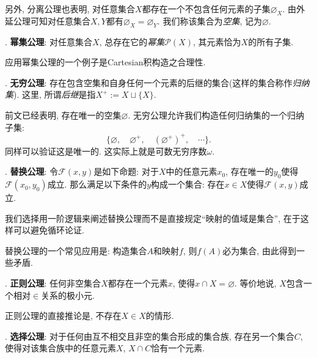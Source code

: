另外, 分离公理也表明, 对任意集合$X$都存在一个不包含任何元素的子集$\varnothing _X$. 由外延公理可知对任意集合$X, Y$都有$\varnothing _X = \varnothing _Y$. 我们称该集合为\textit{空集}, 记为$\varnothing$. 

\vspace{0.5em}
. \textbf{幂集公理}: 对任意集合$X$, 总存在它的\textit{幂集}$\mathcal{P}(X)$, 其元素恰为$X$的所有子集. 

应用幂集公理的一个例子是Cartesian积构造之合理性. 

\vspace{0.5em}
. \textbf{无穷公理}: 存在包含空集和自身任何一个元素的后继的集合(这样的集合称作\textit{归纳集}). 这里, 所谓\textit{后继}是指$X^{+}:=X \sqcup \{ X \}$. 

前文已经表明, 存在唯一的空集$\varnothing$. 无穷公理允许我们构造任何归纳集的一个归纳子集: $$\{ \varnothing ,\quad \varnothing ^+ ,\quad (\varnothing ^+)^+, \quad \cdots \} .$$
同样可以验证这是唯一的. 这实际上就是可数无穷序数$\omega$. 

\vspace{0.5em}
. \textbf{替换公理}: 令$\mathcal{F}(x, y)$是如下命题: 对于$X$中的任意元素$x_0$, 存在唯一的$y_0$使得$\mathcal{F}(x_0, y_0)$成立. 那么满足以下条件的$y$构成一个集合: 存在$x \in X$使得$\mathcal{F}(x, y)$成立. 

我们选择用一阶逻辑来阐述替换公理而不是直接规定“映射的值域是集合”, 在于这样可以避免循环论证. 

替换公理的一个常见应用是: 构造集合$A$和映射$f$, 则$f(A)$必为集合, 由此得到一些矛盾. 

\vspace{0.5em}
. \textbf{正则公理}: 任何非空集合$X$都存在一个元素$x$, 使得$x \cap X = \varnothing$. 等价地说, $X$包含一个相对$\in $关系的极小元. 

正则公理的直接推论是, 不存在$X \in X$的情形. 

\vspace{0.5em}
. \textbf{选择公理}: 对于任何由互不相交且非空的集合形成的集合族, 存在另一个集合$C$, 使得对该集合族中的任意元素$X$, $X \cap C$恰有一个元素.


